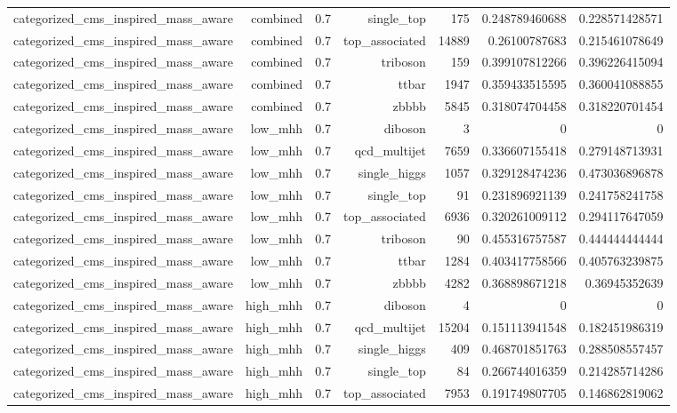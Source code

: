 \begin{table}[htbp]
{\begin{tabular}{lrrrrrr}
categorized\_cms\_inspired\_mass\_aware & combined & 0.7 & single\_top & 175 & 0.248789460688 & 0.228571428571 \\
categorized\_cms\_inspired\_mass\_aware & combined & 0.7 & top\_associated & 14889 & 0.26100787683 & 0.215461078649 \\
categorized\_cms\_inspired\_mass\_aware & combined & 0.7 & triboson & 159 & 0.399107812266 & 0.396226415094 \\
categorized\_cms\_inspired\_mass\_aware & combined & 0.7 & ttbar & 1947 & 0.359433515595 & 0.360041088855 \\
categorized\_cms\_inspired\_mass\_aware & combined & 0.7 & zbbbb & 5845 & 0.318074704458 & 0.318220701454 \\
categorized\_cms\_inspired\_mass\_aware & low\_mhh & 0.7 & diboson & 3 & 0 & 0 \\
categorized\_cms\_inspired\_mass\_aware & low\_mhh & 0.7 & qcd\_multijet & 7659 & 0.336607155418 & 0.279148713931 \\
categorized\_cms\_inspired\_mass\_aware & low\_mhh & 0.7 & single\_higgs & 1057 & 0.329128474236 & 0.473036896878 \\
categorized\_cms\_inspired\_mass\_aware & low\_mhh & 0.7 & single\_top & 91 & 0.231896921139 & 0.241758241758 \\
categorized\_cms\_inspired\_mass\_aware & low\_mhh & 0.7 & top\_associated & 6936 & 0.320261009112 & 0.294117647059 \\
categorized\_cms\_inspired\_mass\_aware & low\_mhh & 0.7 & triboson & 90 & 0.455316757587 & 0.444444444444 \\
categorized\_cms\_inspired\_mass\_aware & low\_mhh & 0.7 & ttbar & 1284 & 0.403417758566 & 0.405763239875 \\
categorized\_cms\_inspired\_mass\_aware & low\_mhh & 0.7 & zbbbb & 4282 & 0.368898671218 & 0.36945352639 \\
categorized\_cms\_inspired\_mass\_aware & high\_mhh & 0.7 & diboson & 4 & 0 & 0 \\
categorized\_cms\_inspired\_mass\_aware & high\_mhh & 0.7 & qcd\_multijet & 15204 & 0.151113941548 & 0.182451986319 \\
categorized\_cms\_inspired\_mass\_aware & high\_mhh & 0.7 & single\_higgs & 409 & 0.468701851763 & 0.288508557457 \\
categorized\_cms\_inspired\_mass\_aware & high\_mhh & 0.7 & single\_top & 84 & 0.266744016359 & 0.214285714286 \\
categorized\_cms\_inspired\_mass\_aware & high\_mhh & 0.7 & top\_associated & 7953 & 0.191749807705 & 0.146862819062 \\

\end{tabular}}
\end{table}
